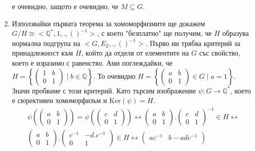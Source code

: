 \documentclass[12pt]{article}
\begin{document}
\begin{enumerate}[label=\alph*)]
    е очевидно, защото е очевидно, че \(M \subseteq G\).
    \item Използвайки първата теорема за хомоморфизмите ще докажем \(G / H \cong <\mathbb{Q}^*, 1, . , ()^{-1}>\), с което "безплатно" ще получим, че \(H\) образува нормална подгрупа на  \(<G, E_2, ., ()^{-1}>\).
    Първо ни трябва критерий за принадлежност към \(H\), който да отделя от елементите на \(G\) със свойство, което е изразимо с равенство.
    Ами поглеждайки, че \(H = \left\{\begin{pmatrix}
    1 & b \\
    0 & 1
    \end{pmatrix} \; \Big| \; b \in \mathbb{Q}\right\}\).
    То очевидно \(H = \left\{\begin{pmatrix}
    a & b \\
    0 & 1
    \end{pmatrix} \in G \; \Big| \; a = 1\right\}\).
    Значи пробваме с този критерий. Като търсим изображение \(\psi : G \to \mathbb{Q}^*\),
    което е сюрективен хомоморфизъм и \(\mathrm{Ker}(\psi) = H\).
    \begin{align*}
        \psi\left(\begin{pmatrix}
        a & b \\
        0 & 1
        \end{pmatrix}\right) = \psi\left(\begin{pmatrix}
        c & d \\
        0 & 1
        \end{pmatrix}\right) \longleftrightarrow
        \begin{pmatrix}
        a & b \\
        0 & 1
        \end{pmatrix} . \begin{pmatrix}
        c & d \\
        0 & 1
        \end{pmatrix}^{-1} \in H \longleftrightarrow \\
        \begin{pmatrix}
        a & b \\
        0 & 1
        \end{pmatrix}. \begin{pmatrix}
        c^{-1} & -d.c^{-1} \\
        0 & 1
        \end{pmatrix} \in H \longleftrightarrow
        \begin{pmatrix}
        ac^{-1} & b - adc^{-1} \\

\end{pmatrix}
\end{align*}
\end{enumerate}
\end{document}
